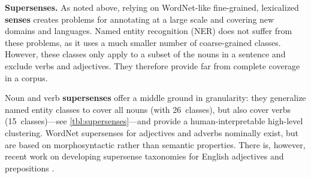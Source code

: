 \documentclass[11pt,letterpaper]{article}
\newcommand{\ensuretext}[1]{#1}
\newcommand{\nssmarker}{\ensuretext{\textcolor{magenta}{\ensuremath{^{\textsc{NS}}_{\textsc{S}}}}}}
\newcommand{\arkcomment}[3]{\ensuretext{\textcolor{#3}{[#1 #2]}}}
\newcommand{\nss}[1]{\arkcomment{\nssmarker}{#1}{magenta}}
\newcommand{\longversion}[1]{#1} %
\begin{document}
\textbf{Supersenses.}
% 
As noted above, relying on WordNet-like fine-grained, lexicalized \textbf{senses} 
creates problems for annotating at a large scale and covering new domains and languages. 
Named entity recognition (NER) does not suffer from these problems, 
as it uses a much smaller number of coarse-grained classes. 
However, these classes only apply to a subset of the nouns in a sentence and exclude verbs and adjectives.
They therefore provide far from complete coverage in a corpus.

Noun and verb \textbf{supersenses} \citep{ciaramita-06}
offer a middle ground in granularity: they generalize 
named entity classes to cover all nouns (with 26~classes), but also cover verbs (15~classes)---see \cref{tbl:supersenses}---and provide a human-interpretable high-level clustering. WordNet supersenses for adjectives and adverbs nominally exist, 
but are based on morphosyntactic rather than semantic properties.  
There is, however, recent work on developing supersense taxonomies for English adjectives and prepositions \citep{tsvetkov-14,schneider-15-law}.
\end{document}
